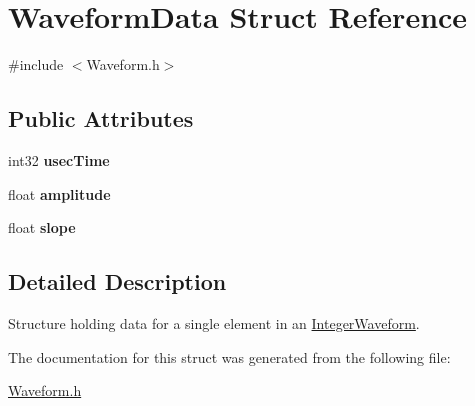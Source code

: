 \hypertarget{structWaveformData}{
\section{WaveformData Struct Reference}
\label{structWaveformData}
}


{\ttfamily \#include $<$Waveform.h$>$}

\subsection*{Public Attributes}
\begin{DoxyCompactItemize}
\item 
\hypertarget{structWaveformData_ac89ea88a20508737461c9a455f5329fc}{
int32 {\bfseries usecTime}}
\label{structWaveformData_ac89ea88a20508737461c9a455f5329fc}

\item 
\hypertarget{structWaveformData_a4008c00e5513f941725b97518d98e0e3}{
float {\bfseries amplitude}}
\label{structWaveformData_a4008c00e5513f941725b97518d98e0e3}

\item 
\hypertarget{structWaveformData_a2057bcb61284354ad64e63d97852db2c}{
float {\bfseries slope}}
\label{structWaveformData_a2057bcb61284354ad64e63d97852db2c}

\end{DoxyCompactItemize}


\subsection{Detailed Description}
Structure holding data for a single element in an \hyperlink{classIntegerWaveform}{IntegerWaveform}. 

The documentation for this struct was generated from the following file:\begin{DoxyCompactItemize}
\item 
\hyperlink{Waveform_8h}{Waveform.h}\end{DoxyCompactItemize}
